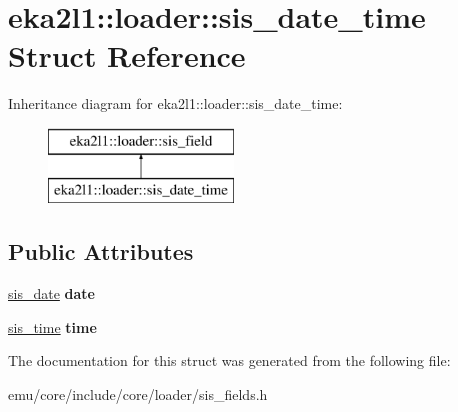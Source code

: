 \hypertarget{structeka2l1_1_1loader_1_1sis__date__time}{}\section{eka2l1\+:\+:loader\+:\+:sis\+\_\+date\+\_\+time Struct Reference}
\label{structeka2l1_1_1loader_1_1sis__date__time}
Inheritance diagram for eka2l1\+:\+:loader\+:\+:sis\+\_\+date\+\_\+time\+:\begin{figure}[H]
\begin{center}
\leavevmode
\includegraphics[height=2.000000cm]{structeka2l1_1_1loader_1_1sis__date__time}
\end{center}
\end{figure}
\subsection*{Public Attributes}
\begin{DoxyCompactItemize}
\item 
\mbox{\label{structeka2l1_1_1loader_1_1sis__date__time_a5345f8149adf04d15d1db6820b98b53b}} 
\mbox{\hyperlink{structeka2l1_1_1loader_1_1sis__date}{sis\+\_\+date}} {\bfseries date}
\item 
\mbox{\label{structeka2l1_1_1loader_1_1sis__date__time_a646422a030a96188e4444202a6fefb17}} 
\mbox{\hyperlink{structeka2l1_1_1loader_1_1sis__time}{sis\+\_\+time}} {\bfseries time}
\end{DoxyCompactItemize}


The documentation for this struct was generated from the following file\+:\begin{DoxyCompactItemize}
\item 
emu/core/include/core/loader/sis\+\_\+fields.\+h\end{DoxyCompactItemize}
